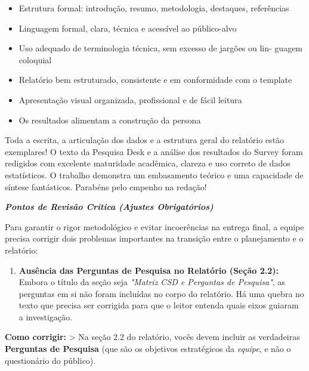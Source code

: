 \documentclass[
  sigconf,
  nonacm, %
  language=portuguese
]{acmart}
\begin{document}
\begin{itemize}[leftmargin=14pt,itemsep=1pt,topsep=3pt,parsep=0pt]
  \item[\textcolor{cgood}{$\checkmark$}] {\small\textcolor{cgood}{Estrutura formal: introdução, resumo, metodologia, destaques, referências}}
  \item[\textcolor{cgood}{$\checkmark$}] {\small\textcolor{cgood}{Linguagem formal, clara, técnica e acessível ao público-alvo}}
  \item[\textcolor{cgood}{$\checkmark$}] {\small\textcolor{cgood}{Uso adequado de terminologia técnica, sem excesso de jargões ou lin- guagem coloquial}}
  \item[\textcolor{cgood}{$\checkmark$}] {\small\textcolor{cgood}{Relatório bem estruturado, consistente e em conformidade com o template}}
  \item[\textcolor{cgood}{$\checkmark$}] {\small\textcolor{cgood}{Apresentação visual organizada, profissional e de fácil leitura}}
  \item[\textcolor{cgood}{$\checkmark$}] {\small\textcolor{cgood}{Os resultados alimentam a construção da persona}}
\end{itemize}

Toda a escrita, a articulação dos dados e a estrutura geral do relatório estão exemplares! O texto da Pesquisa Desk e a análise dos resultados do Survey foram redigidos com excelente maturidade acadêmica, clareza e uso correto de dados estatísticos. O trabalho demonstra um embasamento teórico e uma capacidade de síntese fantásticos. Parabéns pelo empenho na redação!

\textit{\textbf{\textbf{Pontos de Revisão Crítica (Ajustes Obrigatórios)}}}

Para garantir o rigor metodológico e evitar incoerências na entrega final, a equipe precisa corrigir dois problemas importantes na transição entre o planejamento e o relatório:

\begin{enumerate}[leftmargin=14pt,itemsep=2pt,topsep=4pt]
  \item \textbf{Ausência das Perguntas de Pesquisa no Relatório (Seção 2.2):} Embora o título da seção seja \textit{"Matriz CSD e Perguntas de Pesquisa"}, as perguntas em si não foram incluídas no corpo do relatório. Há uma quebra no texto que precisa ser corrigida para que o leitor entenda quais eixos guiaram a investigação.
\end{enumerate}

\textbf{Como corrigir:} > Na seção 2.2 do relatório, vocês devem incluir as verdadeiras \textbf{Perguntas de Pesquisa} (que são os objetivos estratégicos da \textit{equipe}, e não o questionário do público).
\end{document}
